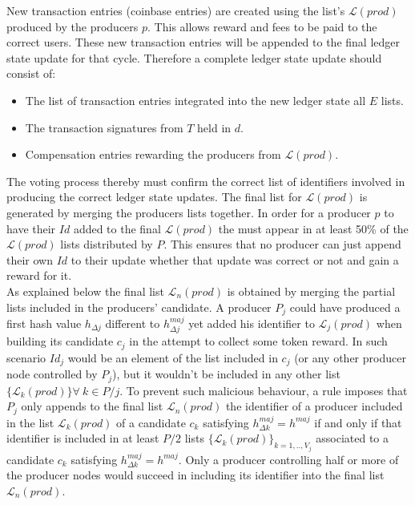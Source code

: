 \documentclass{article}
\begin{document}
New transaction entries (coinbase entries) are created using the list's  $\mathcal{L}(prod)$ produced by the producers $p$. This allows reward and fees to be paid to the correct users. These new transaction entries will be appended to the final ledger state update for that cycle. Therefore a complete ledger state update should consist of: 

\begin{itemize}
\item The list of transaction entries integrated into the new ledger state all $E$ lists. 
\item The transaction signatures from $T$ held in $d$. 
\item Compensation entries rewarding the producers from $\mathcal{L}(prod)$. 

\end{itemize} 


The voting process thereby must confirm the correct list of identifiers involved in producing the correct ledger state updates. The final list for  $\mathcal{L}(prod)$ is generated by merging the producers lists together. In order for a producer $p$ to have their $Id$ added to the final  $\mathcal{L}(prod)$ the must appear in at least 50\% of the  $\mathcal{L}(prod)$ lists distributed by $P$. This ensures that no producer can just append their own $Id$ to their update whether that update was correct or not and gain a reward for it. \\


As explained below the final list $\mathcal{L}_n(prod)$ is obtained by merging the partial lists included in the producers' candidate. A producer $P_j$ could have produced a first hash value $h_{\Delta j}$ different to $h^{maj}_{\Delta j}$ yet added his identifier to $\mathcal{L}_j(prod)$ when building its candidate $c_j$ in the attempt to collect some token reward. In such scenario $Id_j$ would be an element of the list included in $c_j$ (or any other producer node controlled by $P_j$), but it wouldn't be included in any other list $\{\mathcal{L}_k(prod)\} \forall~k \in P/j$. To prevent such malicious behaviour, a rule imposes that $P_j$ only appends to the final list $\mathcal{L}_n(prod)$ the identifier of a producer included in the list $\mathcal{L}_k(prod)$ of a candidate $c_k$ satisfying $h^{maj}_{\Delta k} = h^{maj}$ if and only if that identifier is included in at least $P/2$ lists $\{\mathcal{L}_{k}(prod)\}_{k=1,..,V_j}$ associated to a candidate $c_{k}$ satisfying $h^{maj}_{\Delta k} = h^{maj}$. Only a producer controlling half or more of the producer nodes would succeed in including its identifier into the final list $\mathcal{L}_n(prod)$.\\
\end{document}
